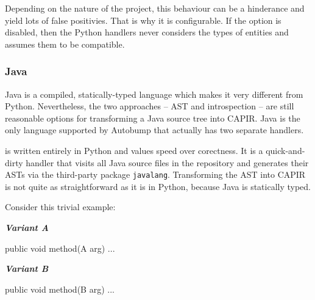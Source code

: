 \documentclass{l4proj}
\begin{document}
Depending on the nature of the project, this behaviour can be a
hinderance and yield lots of false positivies. That is why it is
configurable. If the option is disabled, then the Python handlers
never considers the types of entities and assumes them to be compatible.

\subsubsection{Java}
\label{JavaHandlers}

Java is a compiled, statically-typed language which makes it very
different from Python. Nevertheless, the two approaches -- AST
and introspection -- are still reasonable options for transforming a
Java source tree into CAPIR. Java is the only language supported by
Autobump that actually has two separate handlers.

\texttt{} is written entirely in Python and
values speed over corectness. It is a quick-and-dirty handler that
visits all Java source files in the repository and generates their
ASTs via the third-party package \texttt{javalang}\cite{Javalang}.
Transforming the AST into CAPIR is not quite as straightforward as it
is in Python, because Java is statically typed.

Consider this trivial example:

\lstset{language=Java}
\begin{minipage}[t]{0.5\textwidth}
\noindent\textbf{\textit{Variant A}}\\
\begin{java}
public void method(A arg) { ... }
\end{java}
\end{minipage}
\begin{minipage}[t]{0.5\textwidth}
\noindent\textbf{\textit{Variant B}}\\
\begin{java}
public void method(B arg) { ... }
\end{java}
\end{minipage}
\end{document}
